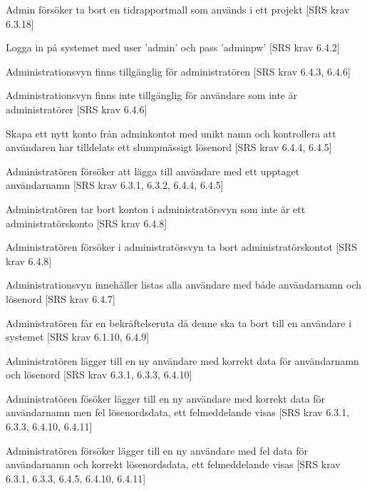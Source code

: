 \documentclass[a4paper]{article}
\begin{document}
\begin{appendices}
\begin{FT}
\item
Admin försöker ta bort en tidrapportmall som används i ett projekt [SRS krav 6.3.18]

\item
Logga in på systemet med user 'admin' och pass 'adminpw' [SRS krav 6.4.2]

\item 
Administrationsvyn finns tillgänglig för administratören [SRS krav 6.4.3, 6.4.6]

\item
Administrationsvyn finns inte tillgänglig för användare som inte är administratörer [SRS krav 6.4.6]

\item
Skapa ett nytt konto från adminkontot med unikt namn och kontrollera att användaren har tilldelats ett slumpmässigt lösenord [SRS krav 6.4.4, 6.4.5]

\item
Administratören försöker att lägga till användare med ett upptaget användarnamn [SRS krav 6.3.1, 6.3.2, 6.4.4, 6.4.5]

\item
Administratören tar bort konton i administratörsvyn som inte är ett administratörskonto [SRS krav 6.4.8]

\item
Administratören försöker i administratörsvyn ta bort administratörskontot [SRS krav 6.4.8]

\item
Administrationsvyn innehåller listas alla användare med både användarnamn och lösenord [SRS krav 6.4.7]

\item
Administratören får en bekräftelseruta då denne ska ta bort till en användare i systemet [SRS krav 6.1.10, 6.4.9]

\item
Administratören lägger till en ny användare med korrekt data för användarnamn och lösenord [SRS krav 6.3.1, 6.3.3, 6.4.10]

\item
Administratören fösöker lägger till en ny användare med korrekt data för användarnamn men fel lösenordsdata, ett felmeddelande visas [SRS krav 6.3.1, 6.3.3, 6.4.10, 6.4.11]

\item
Administratören försöker lägger till en ny användare med fel data för användarnamn och korrekt lösenordsdata, ett felmeddelande visas [SRS krav 6.3.1, 6.3.3, 6.4.5, 6.4.10, 6.4.11]


\end{FT}
\end{appendices}
\end{document}
